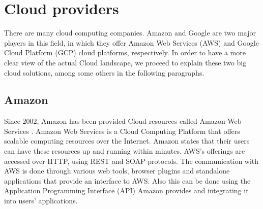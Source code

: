 \section{Cloud providers}
There are many cloud computing companies. Amazon and Google are two major players in this field, in which they offer Amazon Web Services (AWS) and Google Cloud Platform (GCP) cloud platforms, respectively. In order to have a more clear view of the actual Cloud landscape, we proceed to explain these two big cloud solutions, among some others in the following paragraphs.

\subsection{Amazon}
Since 2002, Amazon has been provided Cloud resources called Amazon Web Services \cite{amazon:aws}. Amazon Web Services is a Cloud Computing Platform that offers scalable computing resources over the Internet. Amazon states that their users can have these resources up and running within minutes. AWS's offerings are accessed over HTTP, using REST and SOAP protocols. The communication with AWS is done through various web tools, browser plugins and standalone applications that provide an interface to AWS. Also this can be done using the Application Programming Interface (API) Amazon provides and integrating it into users' applications.

